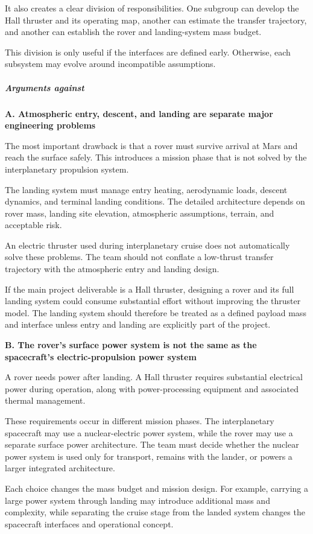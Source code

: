 It also creates a clear division of responsibilities. One
subgroup can develop the Hall thruster and its operating map,
another can estimate the transfer trajectory, and another
can establish the rover and landing-system mass budget.

This division is only useful if the interfaces are defined
early. Otherwise, each subsystem may evolve around incompatible
assumptions.

\subparagraph{Arguments against}

\textbf{A. Atmospheric entry, descent, and landing are
	separate major engineering problems}

The most important drawback is that a rover must survive
arrival at Mars and reach the surface safely. This introduces
a mission phase that is not solved by the interplanetary
propulsion system.

The landing system must manage entry heating, aerodynamic
loads, descent dynamics, and terminal landing conditions.
The detailed architecture depends on rover mass, landing
site elevation, atmospheric assumptions, terrain, and
acceptable risk.

An electric thruster used during interplanetary cruise does
not automatically solve these problems. The team should not
conflate a low-thrust transfer trajectory with the atmospheric
entry and landing design.

If the main project deliverable is a Hall thruster, designing
a rover and its full landing system could consume substantial
effort without improving the thruster model. The landing
system should therefore be treated as a defined payload
mass and interface unless entry and landing are explicitly
part of the project.

\textbf{B. The rover's surface power system is not the
	same as the spacecraft's electric-propulsion power system}

A rover needs power after landing. A Hall thruster requires
substantial electrical power during operation, along with
power-processing equipment and associated thermal management.

These requirements occur in different mission phases. The
interplanetary spacecraft may use a nuclear-electric power
system, while the rover may use a separate surface power
architecture. The team must decide whether the nuclear power
system is used only for transport, remains with the lander,
or powers a larger integrated architecture.

Each choice changes the mass budget and mission design.
For example, carrying a large power system through landing
may introduce additional mass and complexity, while separating
the cruise stage from the landed system changes the spacecraft
interfaces and operational concept.

